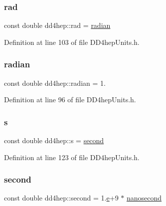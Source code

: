 \subsubsection{\texorpdfstring{rad}{rad}}
{\footnotesize\ttfamily const double dd4hep\+::rad = \hyperlink{namespacedd4hep_aa67a6662923dd0138a6bf6713eddcebb}{radian}\hspace{0.3cm}{\ttfamily [static]}}



Definition at line 103 of file D\+D4hep\+Units.\+h.

\hypertarget{namespacedd4hep_aa67a6662923dd0138a6bf6713eddcebb}{}\label{namespacedd4hep_aa67a6662923dd0138a6bf6713eddcebb} 
\subsubsection{\texorpdfstring{radian}{radian}}
{\footnotesize\ttfamily const double dd4hep\+::radian = 1.\hspace{0.3cm}{\ttfamily [static]}}



Definition at line 96 of file D\+D4hep\+Units.\+h.

\hypertarget{namespacedd4hep_a016f64f3a4662ba41ea7f04ba2d59ef5}{}\label{namespacedd4hep_a016f64f3a4662ba41ea7f04ba2d59ef5} 
\subsubsection{\texorpdfstring{s}{s}}
{\footnotesize\ttfamily const double dd4hep\+::s = \hyperlink{namespacedd4hep_ac03364576705a245265d8ed6ea26b871}{second}\hspace{0.3cm}{\ttfamily [static]}}



Definition at line 123 of file D\+D4hep\+Units.\+h.

\hypertarget{namespacedd4hep_ac03364576705a245265d8ed6ea26b871}{}\label{namespacedd4hep_ac03364576705a245265d8ed6ea26b871} 
\subsubsection{\texorpdfstring{second}{second}}
{\footnotesize\ttfamily const double dd4hep\+::second = 1.\hyperlink{_volumes_8cpp_a8a9a1f93e9b09afccaec215310e64142}{e}+9 $\ast$ \hyperlink{namespacedd4hep_acd3d49e76b85c03111a8bdcaffe4c8c7}{nanosecond}\hspace{0.3cm}{\ttfamily [static]}}



